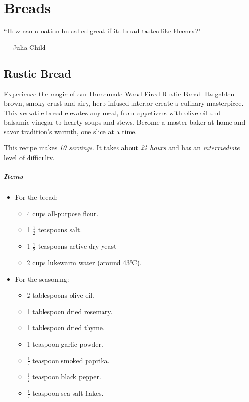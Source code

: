 \chapter{Breads}
\label{breads}
\epigraph{``How can a nation be called great if its bread tastes like kleenex?"}{--- \textup{Julia Child}}

\section{Rustic Bread}
\label{rusticbread}
Experience the magic of our Homemade Wood-Fired Rustic Bread. Its golden-brown, smoky crust and airy, herb-infused interior create a culinary masterpiece. This versatile bread elevates any meal, from appetizers with olive oil and balsamic vinegar to hearty soups and stews. Become a master baker at home and savor tradition's warmth, one slice at a time.

This recipe makes \emph{10 servings}. It takes about \emph{24 hours} and has an \emph{intermediate} level of difficulty. 

\paragraph{Items}
\begin{itemize}
	\item For the bread:
	\begin{itemize}[noitemsep]
	    \item[\ding{182}] 4 cups all-purpose flour.
	    \item[\ding{183}] 1 $\frac{1}{2}$ teaspoons salt.
	    \item[\ding{184}] 1 $\frac{1}{2}$ teaspoons active dry yeast
	    \item[\ding{185}] 2 cups lukewarm water (around 43°C).
	\end{itemize}
	\item For the seasoning:
	\begin{itemize}[noitemsep]
	    \item[\ding{182}] 2 tablespoons olive oil.
	    \item[\ding{183}] 1 tablespoon dried rosemary.
	    \item[\ding{184}] 1 tablespoon dried thyme.
	    \item[\ding{185}] 1 teaspoon garlic powder.
	    \item[\ding{186}] $\frac{1}{2}$ teaspoon smoked paprika.
	    \item[\ding{187}] $\frac{1}{2}$ teaspoon black pepper.
	    \item[\ding{188}] $\frac{1}{2}$ teaspoon sea salt flakes.
	\end{itemize}
\end{itemize}

